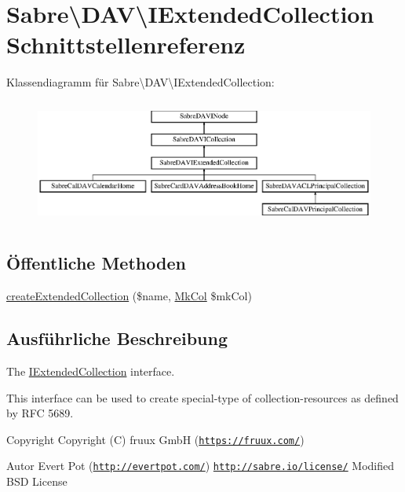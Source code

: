 \hypertarget{interface_sabre_1_1_d_a_v_1_1_i_extended_collection}{}\section{Sabre\textbackslash{}D\+AV\textbackslash{}I\+Extended\+Collection Schnittstellenreferenz}
\label{interface_sabre_1_1_d_a_v_1_1_i_extended_collection}
Klassendiagramm für Sabre\textbackslash{}D\+AV\textbackslash{}I\+Extended\+Collection\+:\begin{figure}[H]
\begin{center}
\leavevmode
\includegraphics[height=4.166667cm]{interface_sabre_1_1_d_a_v_1_1_i_extended_collection}
\end{center}
\end{figure}
\subsection*{Öffentliche Methoden}
\begin{DoxyCompactItemize}
\item 
\mbox{\hyperlink{interface_sabre_1_1_d_a_v_1_1_i_extended_collection_ae17c248155a90ae664ad7fb9854ddf63}{create\+Extended\+Collection}} (\$name, \mbox{\hyperlink{class_sabre_1_1_d_a_v_1_1_mk_col}{Mk\+Col}} \$mk\+Col)
\end{DoxyCompactItemize}


\subsection{Ausführliche Beschreibung}
The \mbox{\hyperlink{interface_sabre_1_1_d_a_v_1_1_i_extended_collection}{I\+Extended\+Collection}} interface.

This interface can be used to create special-\/type of collection-\/resources as defined by R\+FC 5689.

\begin{DoxyCopyright}{Copyright}
Copyright (C) fruux GmbH (\href{https://fruux.com/}{\tt https\+://fruux.\+com/}) 
\end{DoxyCopyright}
\begin{DoxyAuthor}{Autor}
Evert Pot (\href{http://evertpot.com/}{\tt http\+://evertpot.\+com/})  \href{http://sabre.io/license/}{\tt http\+://sabre.\+io/license/} Modified B\+SD License 
\end{DoxyAuthor}


